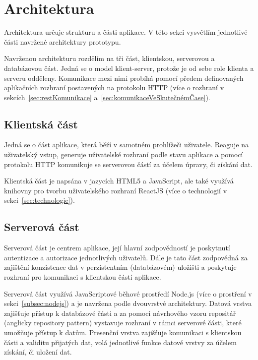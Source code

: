
\section{Architektura}\label{sec:architektura}

Architektura určuje strukturu a části aplikace.
V této sekci vysvětlím jednotlivé části navržené architektury prototypu.

Navrženou architekturu rozdělím na tři část, klientskou, serverovou a databázovou část.
Jedná se o model klient-server, protože je od sebe role klienta a serveru odděleny.
Komunikace mezi nimi probíhá pomocí předem definovaných aplikačních rozhraní postavených na protokolu \gls{HTTP} (více o rozhraní v sekcích~\ref{sec:restKomunikace} a~\ref{sec:komunikaceVeSkutečnémČase}).

\subsection{Klientská část}\label{subsec:klientskáČást}

Jedná se o část aplikace, která běží v samotném prohlížeči uživatele.
Reaguje na uživatelský vstup, generuje uživatelské rozhraní podle stavu aplikace a pomocí protokolu \gls{HTTP} komunikuje se serverovou částí za účelem úpravy, či získání dat.

Klientská část je napsána v jazycích HTML5 a JavaScript, ale také využívá knihovny pro tvorbu uživatelského rozhraní ReactJS (více o technologií v sekci~\ref{sec:technologie}).

\subsection{Serverová část}\label{subsec:serverováČást}

Serverová část je centrem aplikace, její hlavní zodpovědností je poskytnutí autentizace a autorizace jednotlivých uživatelů.
Dále je tato část zodpovědná za zajištění konzistence dat v perzistentním (databázovém) uložišti a poskytuje rozhraní pro komunikaci s klientskou částí aplikace.

Serverová část využívá JavaScriptové běhové prostředí Node.js (více o prostření v sekci~\ref{subsec:nodejs}) a je navržena podle dvouvrstvé architektury.
Datová vrstva zajišťuje přístup k databázové části a za pomoci návrhového vzoru repositář (anglicky repository pattern) vystavuje rozhraní v rámci serverové části, které umožňuje přístup k datům.
Presenční vrstva zajišťuje komunikaci s klientskou části a validitu přijatých dat, volá jednotlivé funkce datové vrstvy za účelem získání, či uložení dat.

